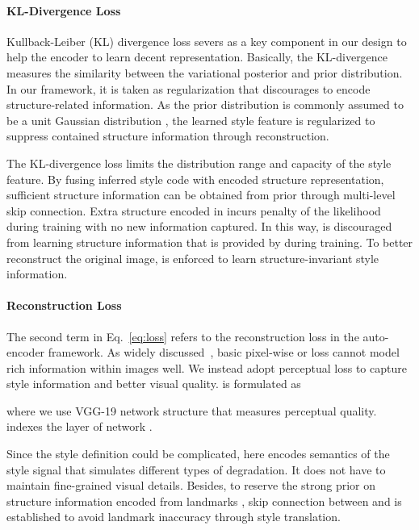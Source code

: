 \documentclass[10pt,twocolumn,letterpaper]{article}
\begin{document}
\vspace{-0.12in}
\paragraph{KL-Divergence Loss} Kullback-Leiber (KL) divergence loss severs as a key component in our design to help the encoder to learn decent representation. Basically, the KL-divergence measures the similarity between the variational posterior and prior distribution. In our framework, it is taken as regularization that discourages  to encode structure-related information. As the prior distribution is commonly assumed to be a unit Gaussian distribution , the learned style feature is regularized to suppress contained structure information through reconstruction. 

The KL-divergence loss limits the distribution range and capacity of the style feature. By fusing inferred style code  with encoded structure representation, sufficient structure information can be obtained from prior through multi-level skip connection. Extra structure encoded in  incurs penalty of the likelihood  during training with no new information captured. In this way,  is discouraged from learning structure information that is provided by  during training. To better reconstruct the original image,  is enforced to learn structure-invariant style information. 

\vspace{-0.12in}
\paragraph{Reconstruction Loss} The second term  in Eq.~\eqref{eq:loss} refers to the reconstruction loss in the auto-encoder framework. As widely discussed~\cite{zhu2017unpaired,johnson2016perceptual}, basic pixel-wise  or  loss cannot model rich information within images well. We instead adopt perceptual loss to capture style information and better visual quality.  is formulated as

where we use VGG-19 network  structure that measures perceptual quality.  indexes the layer of network . 

Since the style definition could be complicated,  here encodes semantics of the style signal that simulates different types of degradation. It does not have to maintain fine-grained visual details. Besides, to reserve the strong prior on structure information encoded from landmarks , skip connection between  and  is established to avoid landmark inaccuracy through style translation. 
\end{document}
